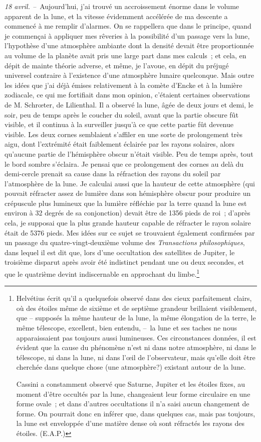 \documentclass[french,twoside]{book} %
\begin{document}
\emph{18 avril. –} Aujourd’hui, j’ai trouvé un accroissement énorme dans le volume apparent de la lune, et la vitesse évidemment accélérée de ma descente a commencé à me remplir d’alarmes. On se rappellera que dans le principe, quand je commençai à appliquer mes rêveries à la possibilité d’un passage vers la lune, l’hypothèse d’une atmosphère ambiante dont la densité devait être proportionnée au volume de la planète avait pris une large part dans mes calculs ; et cela, en dépit de mainte théorie adverse, et même, je l’avoue, en dépit du préjugé universel contraire à l’existence d’une atmosphère lunaire quelconque. Mais outre les idées que j’ai déjà émises relativement à la comète d’Encke et à la lumière zodiacale, ce qui me fortifiait dans mon opinion, c’étaient certaines observations de M. Schrœter, de Lilienthal. Il a observé la lune, âgée de deux jours et demi, le soir, peu de temps après le coucher du soleil, avant que la partie obscure fût visible, et il continua à la surveiller jusqu’à ce que cette partie fût devenue visible. Les deux cornes semblaient s’affiler en une sorte de prolongement très aigu, dont l’extrémité était faiblement éclairée par les rayons solaires, alors qu’aucune partie de l’hémisphère obscur n’était visible. Peu de temps après, tout le bord sombre s’éclaira. Je pensai que ce prolongement des cornes au delà du demi-cercle prenait sa cause dans la réfraction des rayons du soleil par l’atmosphère de la lune. Je calculai aussi que la hauteur de cette atmosphère (qui pouvait réfracter assez de lumière dans son hémisphère obscur pour produire un crépuscule plus lumineux que la lumière réfléchie par la terre quand la lune est environ à 32 degrés de sa conjonction) devait être de 1356 pieds de roi ; d’après cela, je supposai que la plus grande hauteur capable de réfracter le rayon solaire était de 5376 pieds. Mes idées sur ce sujet se trouvaient également confirmées par un passage du quatre-vingt-deuxième volume des \emph{Transactions philosophiques}, dans lequel il est dit que, lors d’une occultation des satellites de Jupiter, le troisième disparut après avoir été indistinct pendant une ou deux secondes, et que le quatrième devint indiscernable en approchant du limbe.\footnote{ \noindent Helvétius écrit qu’il a quelquefois observé dans des cieux parfaitement clairs, où des étoiles même de sixième et de septième grandeur brillaient visiblement, que – supposés la même hauteur de la lune, la même élongation de la terre, le même télescope, excellent, bien entendu, – la lune et ses taches ne nous apparaissaient pas toujours aussi lumineuses. Ces circonstances données, il est évident que la cause du phénomène n’est ni dans notre atmosphère, ni dans le télescope, ni dans la lune, ni dans l’œil de l’observateur, mais qu’elle doit être cherchée dans quelque chose (une atmosphère?) existant autour de la lune.\par
 Cassini a constamment observé que Saturne, Jupiter et les étoiles fixes, au moment d’être occultés par la lune, changeaient leur forme circulaire en une forme ovale ; et dans d’autres occultations il n’a saisi aucun changement de forme. On pourrait donc en inférer que, dans quelques cas, mais pas toujours, la lune est enveloppée d’une matière dense où sont réfractés les rayons des étoiles. (E.A.P.)
}\par
\end{document}
